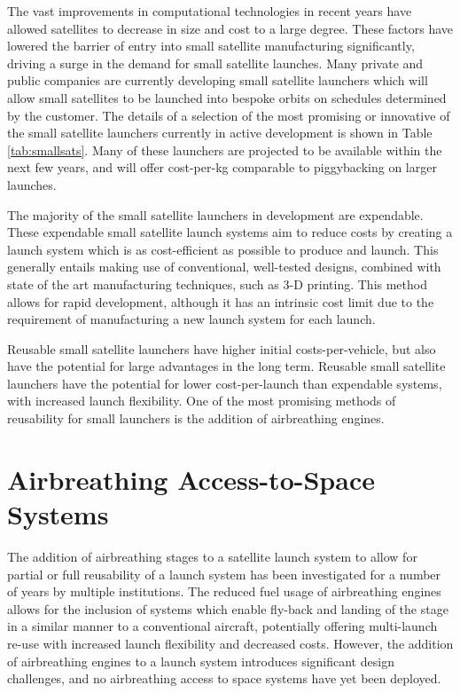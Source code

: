  
  The vast improvements in computational technologies in recent years have allowed satellites to decrease in size and cost to a large degree. These factors have lowered the barrier of entry into small satellite manufacturing significantly, driving a surge in the demand for small satellite launches. Many private and public companies are currently developing small satellite launchers which will allow small satellites to be launched into bespoke orbits on schedules determined by the customer\cite{Faa2018}. The details of a selection of the most promising or innovative of the small satellite launchers currently in active development is shown in Table \ref{tab:smallsats}. Many of these launchers are projected to be available within the next few years, and will offer cost-per-kg comparable to piggybacking on larger launches. 
  
  
  
  The majority of the small satellite launchers in development are expendable\cite{Niederstrasser2015}. These expendable small satellite launch systems aim to reduce costs by creating a launch system which is as cost-efficient as possible to produce and launch\cite{Niederstrasser2015}. This generally entails making use of conventional, well-tested designs, combined with state of the art manufacturing techniques, such as 3-D printing\cite{Niederstrasser2015,Gilmour}. This method allows for rapid development, although it has an intrinsic cost limit due to the requirement of manufacturing a new launch system for each launch.  
  
  Reusable small satellite launchers have higher initial costs-per-vehicle, but also have the potential for large advantages in the long term\cite{Preller2017b}. Reusable small satellite launchers have the potential for lower cost-per-launch than expendable systems, with increased launch flexibility\cite{Preller2017b}. 
 One of the most promising methods of reusability for small launchers is the addition of airbreathing engines\cite{Smart2009}.

   

  
  

  
  
  \section{Airbreathing Access-to-Space Systems}

  
  
  
    The addition of airbreathing stages to a satellite launch system to allow for partial or full reusability of a launch system has been investigated for a number of years by multiple institutions\cite{Powell1991,Wilhite1991,Varvill2008,Tsuchiya2005,Mehta2001,Preller2017b,Trefny1999,Roche2000,Young2006,Bradford2000,Gong2014}. The reduced fuel usage of airbreathing engines allows for the inclusion of systems which enable fly-back and landing of the stage in a similar manner to a conventional aircraft, potentially offering multi-launch re-use with increased launch flexibility and decreased costs\cite{Preller2017b}. However, the addition of airbreathing engines to a launch system introduces significant design challenges, and 
    no airbreathing access to space systems have yet been deployed. 
    
